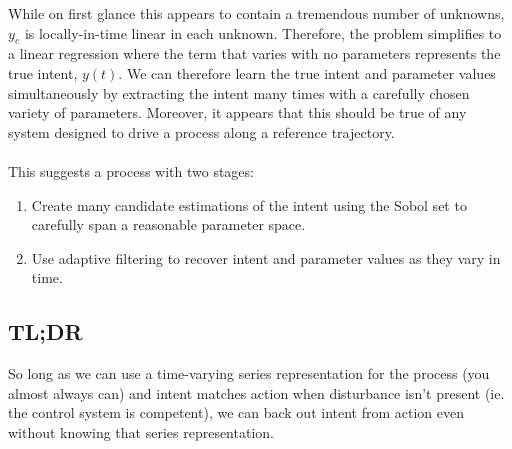 \documentclass[10pt]{article}
\begin{document}
While on first glance this appears to contain a tremendous number of unknowns, $y_e$ is locally-in-time linear in each unknown. Therefore, the problem simplifies to a linear regression where the term that varies with no parameters represents the true intent, $y(t)$. We can therefore learn the true intent and parameter values simultaneously by extracting the intent many times with a carefully chosen variety of parameters. Moreover, it appears that this should be true of any system designed to drive a process along a reference trajectory.
\\\\
This suggests a process with two stages:
\begin{enumerate}
\item Create many candidate estimations of the intent using the Sobol set to carefully span a reasonable parameter space.
\item Use adaptive filtering to recover intent and parameter values as they vary in time.
\end{enumerate}

\subsection*{TL;DR}
So long as we can use a time-varying series representation for the process (you almost always can) and intent matches action when disturbance isn't present (ie. the control system is competent), we can back out intent from action even without knowing that series representation.
\end{document}
